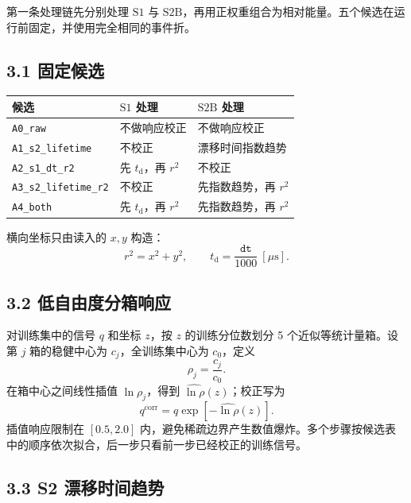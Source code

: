 \documentclass[UTF8,11pt,a4paper,oneside,fontset=none]{ctexart}
\newcommand{\SoneLY}{\mathrm{S1}}
\newcommand{\StwoLY}{\mathrm{S2B}}
\begin{document}
第一条处理链先分别处理 $\SoneLY$ 与 $\StwoLY$，再用正权重组合为相对能量。五个候选在运行前固定，并使用完全相同的事件折。

\subsection*{3.1 固定候选}

\begin{tabularx}{\textwidth}{@{}C{3.3cm} Y Y@{}}
\toprule
{}\textbf{候选} & \textbf{$\SoneLY$ 处理} & \textbf{$\StwoLY$ 处理}\\
\midrule
\texttt{A0\_raw} & 不做响应校正 & 不做响应校正\\
\texttt{A1\_s2\_lifetime} & 不校正 & 漂移时间指数趋势\\
\texttt{A2\_s1\_dt\_r2} & 先 $t_{\mathrm d}$，再 $r^2$ & 不校正\\
\texttt{A3\_s2\_lifetime\_r2} & 不校正 & 先指数趋势，再 $r^2$\\
\texttt{A4\_both} & 先 $t_{\mathrm d}$，再 $r^2$ & 先指数趋势，再 $r^2$\\
\bottomrule
\end{tabularx}

横向坐标只由读入的 $x,y$ 构造：
\begin{equation}
  r^2=x^2+y^2,
  \qquad
  t_{\mathrm d}=\frac{\texttt{dt}}{1000}\ [\mu\mathrm{s}].
\end{equation}

\subsection*{3.2 低自由度分箱响应}

对训练集中的信号 $q$ 和坐标 $z$，按 $z$ 的训练分位数划分 5 个近似等统计量箱。设第 $j$ 箱的稳健中心为 $c_j$，全训练集中心为 $c_0$，定义
\begin{equation}
  \rho_j=\frac{c_j}{c_0}.
\end{equation}
在箱中心之间线性插值 $\ln\rho_j$，得到 $\widehat{\ln\rho}(z)$；校正写为
\begin{equation}
  q^{\mathrm{corr}}
  =q\exp\!\left[-\widehat{\ln\rho}(z)\right].
\end{equation}
插值响应限制在 $[0.5,2.0]$ 内，避免稀疏边界产生数值爆炸。多个步骤按候选表中的顺序依次拟合，后一步只看前一步已经校正的训练信号。

\subsection*{3.3 S2 漂移时间趋势}
\end{document}
